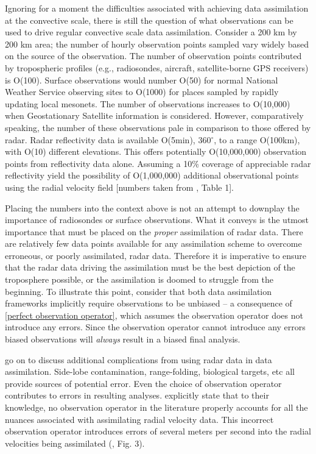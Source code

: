 Ignoring for a moment the difficulties associated with achieving data assimilation at the convective scale, there is still the question of what observations can be used to drive regular convective scale data assimilation. Consider a 200 km by 200 km area; the number of hourly observation points sampled vary widely based on the source of the observation. The number of observation points contributed by tropospheric profiles (e.g., radiosondes, aircraft, satellite-borne GPS receivers) is O(100). Surface observations would number O(50) for normal National Weather Service observing sites to O(1000) for places sampled by rapidly updating local mesonets. The number of observations increases to O(10,000) when Geostationary Satellite information is considered. However, comparatively speaking, the number of these observations pale in comparison to those offered by radar. Radar reflectivity data is available O(5min), 360$^{\circ}$, to a range O(100km), with O(10) different elevations. This offers potentially O(10,000,000) observation points from reflectivity data alone. Assuming a 10\% coverage of appreciable radar reflectivity yield the possibility of O(1,000,000) additional observational points using the radial velocity field [numbers taken from \cite{fabry2011details}, Table 1].


Placing the numbers into the context above is not an attempt to downplay the importance of radiosondes or surface observations. What it conveys is the utmost importance that must be placed on the \emph{proper} assimilation of radar data. There are relatively few data points available for any assimilation scheme to overcome erroneous, or poorly assimilated, radar data. Therefore it is imperative to ensure that the radar data driving the assimilation must be the best depiction of the troposphere possible, or the assimilation is doomed to struggle from the beginning. To illustrate this point, consider that both data assimilation frameworks implicitly require observations to be unbiased -- a consequence of \ref{perfect observation operator}, which assumes the observation operator does not introduce any errors. Since the observation operator cannot introduce any errors biased observations will \emph{always} result in a biased final analysis.


\cite{fabry2011details} go on to discuss additional complications from using radar data in data assimilation. Side-lobe contamination, range-folding, biological targets, etc all provide sources of potential error. Even the choice of observation operator  contributes to errors in resulting analyses. \cite{fabry2011details} explicitly state that to their knowledge, no observation operator in the literature properly accounts for all the nuances associated with assimilating radial velocity data. This incorrect observation operator introduces errors of several meters per second into the radial velocities being assimilated (\citealp{fabry2011details}, Fig. 3).



